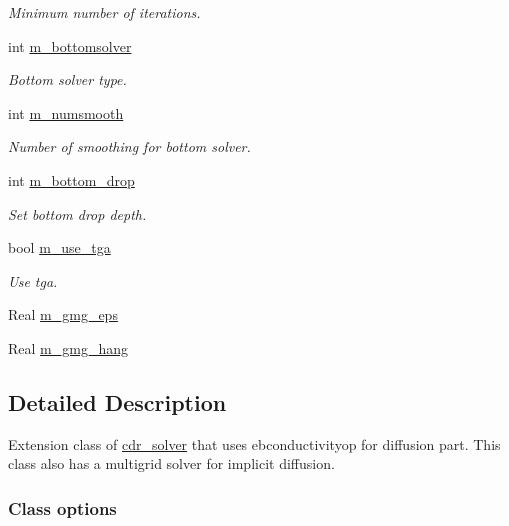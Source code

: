 \begin{DoxyCompactItemize}
\begin{DoxyCompactList}\small\item\em Minimum number of iterations. \end{DoxyCompactList}\item 
int \hyperlink{classcdr__tga_a7f85e3c3ef8712e8e3b24feb081f1d06}{m\+\_\+bottomsolver}
\begin{DoxyCompactList}\small\item\em Bottom solver type. \end{DoxyCompactList}\item 
int \hyperlink{classcdr__tga_af42be1f9af525ae00ef5603457c563a8}{m\+\_\+numsmooth}
\begin{DoxyCompactList}\small\item\em Number of smoothing for bottom solver. \end{DoxyCompactList}\item 
int \hyperlink{classcdr__tga_afe42b10c1f52be8eb7a4d1b5a0e30277}{m\+\_\+bottom\+\_\+drop}
\begin{DoxyCompactList}\small\item\em Set bottom drop depth. \end{DoxyCompactList}\item 
bool \hyperlink{classcdr__tga_a57c77b2e62a80b8752a7b04f868ca474}{m\+\_\+use\+\_\+tga}
\begin{DoxyCompactList}\small\item\em Use tga. \end{DoxyCompactList}\item 
Real \hyperlink{classcdr__tga_a432de2e218262dcf0b29ec67079aeae2}{m\+\_\+gmg\+\_\+eps}
\item 
Real \hyperlink{classcdr__tga_a0b73cc99ba56c2d60280e1c486a71595}{m\+\_\+gmg\+\_\+hang}
\end{DoxyCompactItemize}


\subsection{Detailed Description}
Extension class of \hyperlink{classcdr__solver}{cdr\+\_\+solver} that uses ebconductivityop for diffusion part. This class also has a multigrid solver for implicit diffusion. 

\subsubsection*{Class options }

